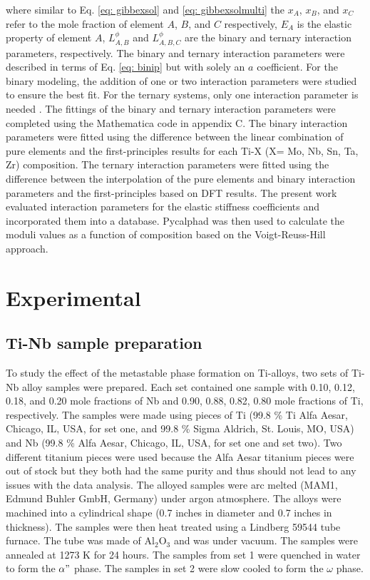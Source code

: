 \noindent where similar to Eq. \ref{eq: gibbexsol} and \ref{eq: gibbexsolmulti} the $x_A$, $x_B$, and $x_C$ refer to the mole fraction of element $A$, $B$, and $C$ respectively, $E_{A}$ is the elastic property of element $A$, $L_{A,B}^{\phi}$ and $L_{A,B,C}^{\phi}$ are the binary and ternary interaction parameters, respectively. The binary and ternary interaction parameters were described in terms of Eq. \ref{eq: binip} but with solely an $a$ coefficient. For the binary modeling, the addition of one or two interaction parameters were studied to ensure the best fit. For the ternary systems, only one interaction parameter is needed \cite{Liu2009,Saunders1998,Lukas2007}. The fittings of the binary and ternary interaction parameters were completed using the Mathematica code in appendix C. The binary interaction parameters were fitted using the difference between the linear combination of pure elements and the first-principles results for each Ti-X (X= Mo, Nb, Sn, Ta, Zr) composition. The ternary interaction parameters were fitted using the difference between the interpolation of the pure elements and binary interaction parameters and the first-principles based on DFT results. The present work evaluated interaction parameters for the elastic stiffness coefficients and incorporated them into a database. Pycalphad \cite{Otis2017} was then used to calculate the moduli values as a function of composition based on the Voigt-Reuss-Hill approach.


\section{Experimental}

\subsection{Ti-Nb sample preparation}

To study the effect of the metastable phase formation on Ti-alloys, two sets of Ti-Nb alloy samples were prepared. Each set contained one sample with 0.10, 0.12, 0.18, and 0.20 mole fractions of Nb and 0.90, 0.88, 0.82, 0.80 mole fractions of Ti, respectively. The samples were made using pieces of Ti (99.8 \% Ti Alfa Aesar, Chicago, IL, USA, for set one, and 99.8 \% Sigma Aldrich, St. Louis, MO, USA) and Nb (99.8 \% Alfa Aesar, Chicago, IL, USA, for set one and set two). Two different titanium pieces were used because the Alfa Aesar titanium pieces were out of stock but they both had the same purity and thus should not lead to any issues with the data analysis. The alloyed samples were arc melted (MAM1, Edmund Buhler GmbH, Germany) under argon atmosphere. The alloys were machined into a cylindrical shape (0.7 inches in diameter and 0.7 inches in thickness). The samples were then heat treated using a Lindberg 59544 tube furnace. The tube was made of Al$_{2}$O$_{3}$ and was under vacuum. The samples were annealed at 1273 K for 24 hours. The samples from set 1 were quenched in water to form the $\alpha"$ phase. The samples in set 2 were slow cooled to form the $\omega$ phase.

